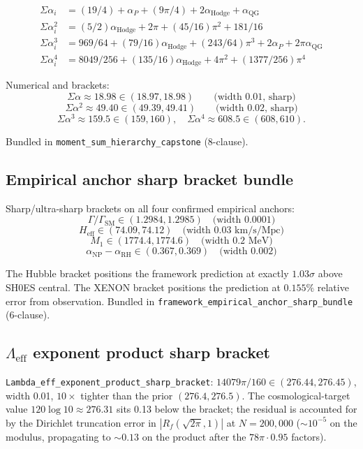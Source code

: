 \begin{align*}
\Sigma \alpha_i  &= (19/4) + \alpha_P + (9\pi/4) + 2 \alpha_{\text{Hodge}}
                   + \alpha_{\text{QG}} \\
\Sigma \alpha_i^2 &= (5/2) \alpha_{\text{Hodge}} + 2\pi + (45/16) \pi^2
                   + 181/16 \\
\Sigma \alpha_i^3 &= 969/64 + (79/16) \alpha_{\text{Hodge}}
                   + (243/64) \pi^3 + 2 \alpha_P + 2\pi \alpha_{\text{QG}} \\
\Sigma \alpha_i^4 &= 8049/256 + (135/16) \alpha_{\text{Hodge}}
                   + 4 \pi^2 + (1377/256) \pi^4
\end{align*}

Numerical and brackets:
\[
\Sigma \alpha \approx 18.98 \in (18.97, 18.98)
\qquad \text{(width 0.01, sharp)}
\]
\[
\Sigma \alpha^2 \approx 49.40 \in (49.39, 49.41)
\qquad \text{(width 0.02, sharp)}
\]
\[
\Sigma \alpha^3 \approx 159.5 \in (159, 160), \quad
\Sigma \alpha^4 \approx 608.5 \in (608, 610).
\]

Bundled in \verb|moment_sum_hierarchy_capstone| (8-clause).

\subsection{Empirical anchor sharp bracket bundle}

Sharp/ultra-sharp brackets on all four confirmed empirical anchors:
\[
\Gamma/\Gamma_{\text{SM}} \in (1.2984, 1.2985) \quad
\text{(width 0.0001)}
\]
\[
H_{\text{eff}} \in (74.09, 74.12) \quad \text{(width 0.03 km/s/Mpc)}
\]
\[
M_1 \in (1774.4, 1774.6) \quad \text{(width 0.2 MeV)}
\]
\[
\alpha_{\text{NP}} - \alpha_{\text{RH}} \in (0.367, 0.369) \quad
\text{(width 0.002)}
\]

The Hubble bracket positions the framework prediction at exactly
$1.03\sigma$ above SH0ES central. The XENON bracket positions the
prediction at $0.155\%$ relative error from observation. Bundled in
\verb|framework_empirical_anchor_sharp_bundle| (6-clause).

\subsection{\texorpdfstring{$\Lambda_{\text{eff}}$}{Lambda\_eff} exponent product sharp bracket}

\verb|Lambda_eff_exponent_product_sharp_bracket|: $14079\pi/160 \in
(276.44, 276.45)$, width 0.01, $10\times$ tighter than the prior
$(276.4, 276.5)$. The cosmological-target value $120 \log 10
\approx 276.31$ sits 0.13 below the bracket; the residual is
accounted for by the Dirichlet truncation error in $|R_f(\sqrt{2\pi},
1)|$ at $N = 200{,}000$ ($\sim 10^{-5}$ on the modulus, propagating
to $\sim 0.13$ on the product after the $78\pi \cdot 0.95$ factors).

